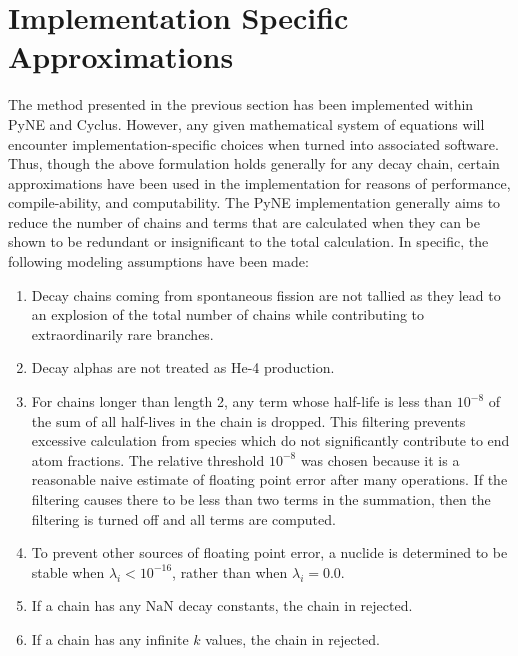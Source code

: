 \documentclass{anstrans}
\begin{document}
\section{Implementation Specific Approximations}
\label{approx}
The method presented in the previous section has been implemented within
PyNE and Cyclus. However, any given mathematical system of equations
will encounter implementation-specific choices when turned into 
associated software. Thus, though the above formulation holds generally for 
any decay chain, certain approximations have been used in the implementation
for reasons of performance, compile-ability, and computability.
The PyNE implementation generally aims to reduce the number of 
chains and terms that are calculated when they can be shown to be 
redundant or insignificant to the total calculation. In specific, the 
following modeling assumptions have been made:

\begin{enumerate}
\item Decay chains coming from spontaneous fission are not tallied as they 
    lead to an explosion of the total number of chains while contributing to 
    extraordinarily rare branches.
\item Decay alphas are not treated as He-4 production.
\item For chains longer than length 2, any 
    term whose half-life is less than $10^{-8}$ of the sum of all 
    half-lives in the chain is dropped. This filtering prevents excessive
    calculation from species which do not significantly contribute to 
    end atom fractions. The relative threshold $10^{-8}$ was chosen
    because it is a reasonable naive estimate of floating point error after 
    many operations. If the filtering causes there to be less than 
    two terms in the summation, then the filtering is turned off and all
    terms are computed.
\item To prevent other sources of floating point error, a nuclide is 
    determined to be stable when $\lambda_i < 10^{-16}$, rather than when 
    $\lambda_i = 0.0$.
\item If a chain has any $\mathrm{NaN}$ decay constants, the chain in rejected.
\item If a chain has any infinite $k$ values, the chain in rejected.
\end{enumerate}
\end{document}
